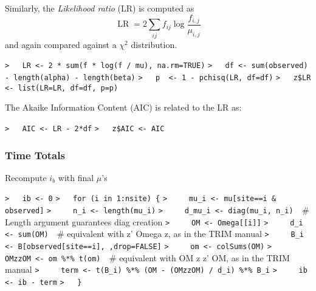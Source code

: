 \documentclass[a4paper]{article}
\begin{document}
Similarly, the \emph{Likelihood ratio} (LR) is computed as
\begin{equation}
  \operatorname{LR} = 2\sum_{ij}f_{ij} \log\frac{f_{i,j}}{\mu_{i,j}} \label{LR}
\end{equation}
and again compared against a $\chi^2$ distribution.\par
\verb~>   LR <- 2 * sum(f * log(f / mu), na.rm=TRUE)~\newline
\verb~>   df <- sum(observed) - length(alpha) - length(beta)~\newline
\verb~>   p  <- 1 - pchisq(LR, df=df)~\newline
\verb~>   z$LR <- list(LR=LR, df=df, p=p)~\par

The Akaike Information Content (AIC) is related to the LR as:\par
\verb~>   AIC <- LR - 2*df~\newline
\verb~>   z$AIC <- AIC~\par



\subsubsection{Time Totals}\par

Recompute $i_b$ with final $\mu$'s\par
\verb~>   ib <- 0~\newline
\verb~>   for (i in 1:nsite) {~\newline
\verb~>     mu_i <- mu[site==i & observed]~\newline
\verb~>     n_i <- length(mu_i)~\newline
\verb~>     d_mu_i <- diag(mu_i, n_i)  ~{\sffamily\# Length argument guarantees diag creation}\newline
\verb~>     OM <- Omega[[i]]~\newline
\verb~>     d_i <- sum(OM)  ~{\sffamily\# equivalent with z' Omega z, as in the TRIM manual}\newline
\verb~>     B_i <- B[observed[site==i], ,drop=FALSE]~\newline
\verb~>     om <- colSums(OM)~\newline
\verb~>     OMzzOM <- om %*% t(om)  ~{\sffamily\# equivalent with OM z z' OM, as in the TRIM manual}\newline
\verb~>     term <- t(B_i) %*% (OM - (OMzzOM) / d_i) %*% B_i~\newline
\verb~>     ib <- ib - term~\newline
\verb~>   }~\par
\end{document}
